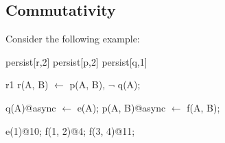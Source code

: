 




\subsection{Commutativity}

Consider the following example:

\begin{Dedalus}
persist[r,2]
persist[p,2]
persist[q,1]

r1
r(A, B) \(\leftarrow\) 
    p(A, B), \(\lnot\) q(A);

q(A)@async \(\leftarrow\) e(A);
p(A, B)@async \(\leftarrow\) f(A, B);

e(1)@10;
f(1, 2)@4;
f(3, 4)@11; 
\end{Dedalus} 

